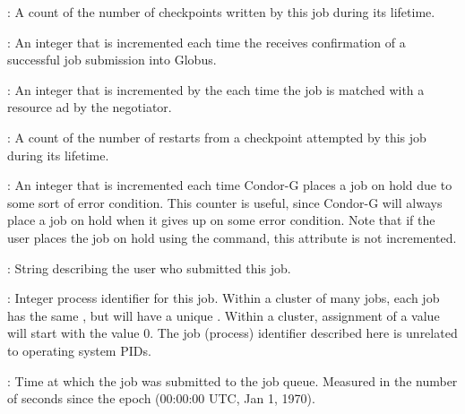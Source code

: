 \begin{description}
\item[\AdAttr{NumCkpts}] : A count of the number of checkpoints
written by this job during its lifetime.

\item[\AdAttr{NumGlobusSubmits}] :  An integer that is incremented each
time the  receives confirmation of a successful job
submission into Globus.

\item[\AdAttr{NumJobMatches}] : An integer that is incremented by the
 each time the job is matched with a resource ad by the
negotiator.

\item[\AdAttr{NumRestarts}] : A count of the number of restarts from a
checkpoint attempted by this job during its lifetime.

\item[\AdAttr{NumSystemHolds}] :  An integer that is incremented each time
Condor-G places a job on hold due to some sort of error condition.  This
counter is useful, since Condor-G will always place a job on hold when it
gives up on some error condition.  Note that if the user places the job
on hold using the  command, this attribute is not incremented.

\item[\AdAttr{Owner}] : String describing the user who submitted this
job.

\item[\AdAttr{ProcId}] : Integer process identifier for this job.
Within a cluster of many jobs,
each job has the same , but will have a unique .
Within a cluster, assignment of a  value will start
with the value 0.
The job (process) identifier described here is unrelated to operating
system PIDs.


\item[\AdAttr{QDate}] : Time at which the job was submitted to the job
queue.  Measured in the
number of seconds since the epoch (00:00:00 UTC, Jan 1, 1970).


\end{description}
